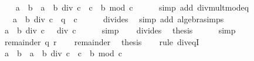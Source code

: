 \begin{isabellebody}
\ \ \isamarkupfalse%
\ {\isachardoublequoteopen}a\ {\isacharasterisk}{\kern0pt}\ b\ {\isacharequal}{\kern0pt}\ a\ {\isacharasterisk}{\kern0pt}\ {\isacharparenleft}{\kern0pt}b\ div\ c\ {\isacharasterisk}{\kern0pt}\ c\ {\isacharplus}{\kern0pt}\ b\ mod\ c{\isacharparenright}{\kern0pt}{\isachardoublequoteclose}\isanewline
\ \ \ \ \isamarkupfalse%
\ {\isacharparenleft}{\kern0pt}simp\ add{\isacharcolon}{\kern0pt}\ div{\isacharunderscore}{\kern0pt}mult{\isacharunderscore}{\kern0pt}mod{\isacharunderscore}{\kern0pt}eq{\isacharparenright}{\kern0pt}\isanewline
\ \ \isamarkupfalse%
\ \isamarkupfalse%
\ {\isachardoublequoteopen}{\isasymdots}\ {\isacharequal}{\kern0pt}\ {\isacharparenleft}{\kern0pt}a\ {\isacharasterisk}{\kern0pt}\ {\isacharparenleft}{\kern0pt}b\ div\ c{\isacharparenright}{\kern0pt}\ {\isacharplus}{\kern0pt}\ q{\isacharparenright}{\kern0pt}\ {\isacharasterisk}{\kern0pt}\ c{\isachardoublequoteclose}\isanewline
\ \ \ \ \isamarkupfalse%
\ divides\ \isamarkupfalse%
\ {\isacharparenleft}{\kern0pt}simp\ add{\isacharcolon}{\kern0pt}\ algebra{\isacharunderscore}{\kern0pt}simps{\isacharparenright}{\kern0pt}\isanewline
\ \ \isamarkupfalse%
\ \isamarkupfalse%
\ {\isachardoublequoteopen}{\isacharparenleft}{\kern0pt}a\ {\isacharasterisk}{\kern0pt}\ b{\isacharparenright}{\kern0pt}\ div\ c\ {\isacharequal}{\kern0pt}\ {\isasymdots}\ div\ c{\isachardoublequoteclose}\isanewline
\ \ \ \ \isamarkupfalse%
\ simp\isanewline
\ \ \isamarkupfalse%
\ divides\ \isamarkupfalse%
\ {\isacharquery}{\kern0pt}thesis\isanewline
\ \ \ \ \isamarkupfalse%
\ simp\isanewline
{}\isamarkupfalse%
\isanewline
\ \ \isamarkupfalse%
\ {\isacharparenleft}{\kern0pt}remainder\ q\ r{\isacharparenright}{\kern0pt}\isanewline
\ \ \isamarkupfalse%
\ remainder{\isacharparenleft}{\kern0pt}{}{\isacharminus}{\kern0pt}{}{\isacharparenright}{\kern0pt}\ \isamarkupfalse%
\ {\isacharquery}{\kern0pt}thesis\isanewline
\ \ \isamarkupfalse%
\ {\isacharparenleft}{\kern0pt}rule\ div{\isacharunderscore}{\kern0pt}eqI{\isacharparenright}{\kern0pt}\isanewline
\ \ \ \ \isamarkupfalse%
\ {\isachardoublequoteopen}a\ {\isacharasterisk}{\kern0pt}\ b\ {\isacharequal}{\kern0pt}\ a\ {\isacharasterisk}{\kern0pt}\ {\isacharparenleft}{\kern0pt}b\ div\ c\ {\isacharasterisk}{\kern0pt}\ c\ {\isacharplus}{\kern0pt}\ b\ mod\ c{\isacharparenright}{\kern0pt}{\isachardoublequoteclose}\isanewline

\end{isabellebody}
